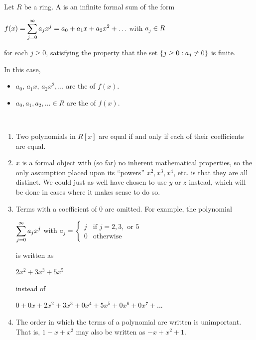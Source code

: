 \documentclass[11pt,fleqn,dvipsnames,usenames]{article}
\newcommand{\p}{\noindent}
\begin{document}
\begin{definition}
Let $R$ be a ring.  A  is an infinite formal sum of the form
\begin{center}
$f(x) = \displaystyle\sum\limits_{j=0}^{\infty}a_{j}x^{j} = a_{0} + a_{1}x + a_{2}x^{2} + \ldots$ with $a_{j}\in R$
\end{center}
for each $j\geq 0$, satisfying the property that the set $\left\{j\geq 0:a_{j}\neq 0\right\}$ is finite.
\end{definition}
%
\terminology In this case,
\begin{itemize}
\item $a_{0}$, $a_{1}x$, $a_{2}x^{2}, \ldots$ are the  of $f(x)$.
\item $a_{0}, a_{1}, a_{2}, \ldots \in R$ are the  of $f(x)$.
\end{itemize}
%
\begin{remarks}~
\begin{enumerate}[(1)]
\item Two polynomials in $R[x]$ are equal if and only if each of their coefficients are equal.
\item $x$ is a formal object with (so far) no inherent mathematical properties, so the only assumption placed upon its ``powers'' $x^{2}, x^{3}, x^{4}$, etc. is that they are all distinct.  We could just as well have chosen to use $y$ or $z$ instead, which will be done in cases where it makes sense to do so.
\item Terms with a coefficient of $0$ are omitted.  For example, the polynomial
\begin{center}
$\displaystyle\sum\limits_{j=0}^{\infty}a_{j}x^{j}$ with $a_{j} = \begin{cases}j & \text{if } j = 2, 3,\text{ or }5\\0 & \text{otherwise}\end{cases}$
\end{center}
\p is written as
\begin{center}
$2x^2 + 3x^3 + 5x^{5}$
\end{center}
\p instead of
\begin{center}
$0 + 0x + 2x^2 + 3x^3 + 0x^4 + 5x^5 + 0x^6 + 0x^7 + ...$
\end{center}
\vsp

\item The order in which the terms of a polynomial are written is unimportant.  That is, $1 - x + x^2$ may also be written as $-x + x^2 + 1$.
\end{enumerate}
\end{remarks}
\end{document}
